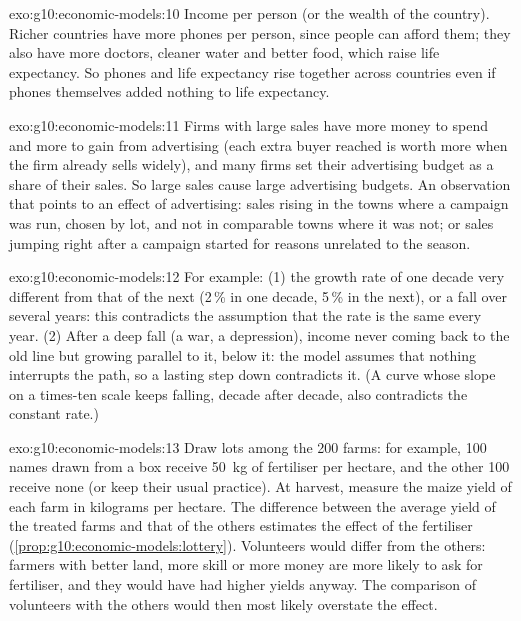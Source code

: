 \begin{solution}{exo:g10:economic-models:10}
Income per person (or the wealth of the country). Richer countries have more phones per person, since
people can afford them; they also have more doctors, cleaner water and better food, which raise life
expectancy. So phones and life expectancy rise together across countries even if phones themselves
added nothing to life expectancy.
\end{solution}

\begin{solution}{exo:g10:economic-models:11}
Firms with large sales have more money to spend and more to gain from advertising (each extra buyer
reached is worth more when the firm already sells widely), and many firms set their advertising
budget as a share of their sales. So large sales cause large advertising budgets. An observation that
points to an effect of advertising: sales rising in the towns where a campaign was run, chosen by
lot, and not in comparable towns where it was not; or sales jumping right after a campaign started
for reasons unrelated to the season.
\end{solution}

\begin{solution}{exo:g10:economic-models:12}
For example: (1) the growth rate of one decade very different from that of the next (2\,\% in one
decade, 5\,\% in the next), or a fall over several years: this contradicts the assumption that the
rate is the same every year. (2) After a deep fall (a war, a depression), income never coming back to
the old line but growing parallel to it, below it: the model assumes that nothing interrupts the
path, so a lasting step down contradicts it. (A curve whose slope on a times-ten scale keeps falling,
decade after decade, also contradicts the constant rate.)
\end{solution}

\begin{solution}{exo:g10:economic-models:13}
Draw lots among the 200 farms: for example, 100 names drawn from a box receive \qty{50}{kg} of
fertiliser per hectare, and the other 100 receive none (or keep their usual practice). At harvest,
measure the maize yield of each farm in kilograms per hectare. The difference between the average
yield of the treated farms and that of the others estimates the effect of the fertiliser
(\cref{prop:g10:economic-models:lottery}). Volunteers would differ from the others: farmers with better
land, more skill or more money are more likely to ask for fertiliser, and they would have had higher
yields anyway. The comparison of volunteers with the others would then most likely overstate the
effect.
\end{solution}


